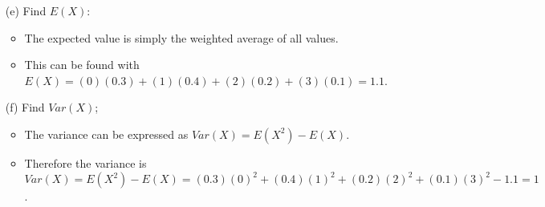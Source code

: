 \documentclass{article}
\begin{document}
\begin{enumerate}
\begin{enumerate}
        \end{enumerate}
    \item [(e)] Find $E(X)$:
        \begin{itemize}
        \item The expected value is simply the weighted average of all values.
        \item This can be found with $E(X) = (0)(0.3) + (1)(0.4) + (2)(0.2) + (3)(0.1) = 1.1$.
        \end{itemize}
    \item [(f)] Find $Var(X)$;
        \begin{itemize}
        \item The variance can be expressed as $Var(X) = E(X^2) - E(X)$.
        \item Therefore the variance is $Var(X) = E(X^2) - E(X)= (0.3)(0)^2 + (0.4)(1)^2 + (0.2)(2)^2 + (0.1)(3)^2 - 1.1= 1$.
        \end{itemize}


\end{enumerate}
\end{document}
